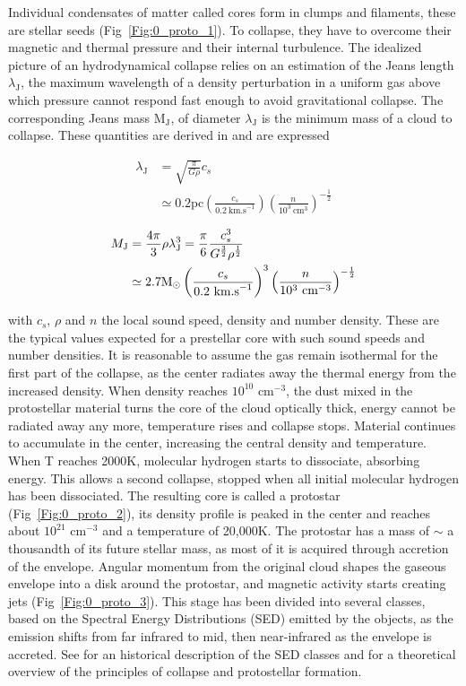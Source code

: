 Individual condensates of matter called cores form in clumps and filaments, these are stellar seeds (Fig~\ref{Fig:0_proto_1}). To collapse, they have to overcome their magnetic and thermal pressure and their internal turbulence. The idealized picture of an hydrodynamical collapse relies on an estimation of the Jeans length $\lambda_\textrm{J}$, the maximum wavelength of a density perturbation in a uniform gas above which pressure cannot respond fast enough to avoid gravitational collapse. The corresponding Jeans mass M$_\textrm{J}$, of diameter $\lambda_\textrm{J}$ is the minimum mass of a cloud to collapse. These quantities are derived in \cite{BT} and are expressed

\begin{align}
\lambda_\textrm{J} & = \sqrt{\frac{\pi}{G \rho}} c_s \\
	 & \simeq  0.2 \textrm{pc} \left( \frac{c_s}{0.2 ~ \textrm{km.s}^{-1}} \right) \left( \frac{n}{10^3 ~ \textrm{cm}^3} \right)^{-\frac{1}{2}}
\end{align}

\begin{align}
M_\textrm{J} &=  \frac{4 \pi}{3} \rho  \lambda_\textrm{J} ^3 =    \frac{\pi}{6}  \frac{c_s^3}{G^\frac{3}{2}\rho^\frac{1}{2}} \\
 & \simeq  2.7 {\textrm{M}_\odot} \left( \frac{c_s}{0.2 ~ \textrm{km.s}^{-1}} \right)^3 \left( \frac{n}{10^3 ~ \textrm{cm}^{-3}} \right)^{-\frac{1}{2}}
\end{align}

with $c_s$, $\rho$ and $n$ the local sound speed, density and number density. These are the typical values expected for a prestellar core with such sound speeds and number densities. It is reasonable to assume the gas remain isothermal for the first part of the collapse, as the center radiates away the thermal energy from the increased density. When density reaches $10^{10}$ cm$^{-3}$, the dust mixed in the protostellar material turns the core of the cloud optically thick, energy cannot be radiated away any more, temperature rises and collapse stops. Material continues to accumulate in the center, increasing the central density and temperature. When T reaches 2000K, molecular hydrogen starts to dissociate, absorbing energy. This allows a second collapse, stopped when all initial molecular hydrogen has been dissociated. The resulting core is called a protostar (Fig~\ref{Fig:0_proto_2}), its density profile is peaked in the center and reaches about $10^{21}$ cm$^{-3}$ and a temperature of 20,000K. The protostar has a mass of $\sim$ a thousandth of its future stellar mass, as most of it is acquired through accretion of the envelope. Angular momentum from the original cloud shapes the gaseous envelope into a disk around the protostar, and magnetic activity starts creating jets (Fig~\ref{Fig:0_proto_3}). This stage has been divided into several classes, based on the Spectral Energy Distributions (SED) emitted by the objects, as the emission shifts from far infrared to mid, then near-infrared as the envelope is accreted. See \cite{Evans2009} for an historical description of the SED classes and \cite{Larson1969} for a theoretical overview of the principles of collapse and protostellar formation. 



